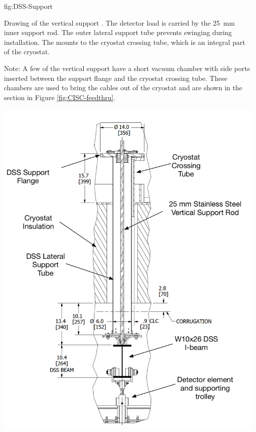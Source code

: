 \begin{dunefigure}{fig:DSS-Support}
  { Drawing of the  vertical support \fdth. The detector load is carried by the \SI{25}{mm} inner support rod. The outer lateral support tube prevents swinging during installation.  The \fdth mounts to the cryostat crossing tube, which is an integral part of the cryostat. 
  
  Note: A few of the  vertical support \fdth have a short vacuum chamber with side ports inserted between the  support flange and the cryostat crossing tube. These chambers are used to bring the  cables out of the cryostat and are shown in the  section in Figure \ref{fig:CISC-feedthru}.}
\includegraphics[width=.85\textwidth]{graphics/DSS-Support.pdf}
\end{dunefigure}


